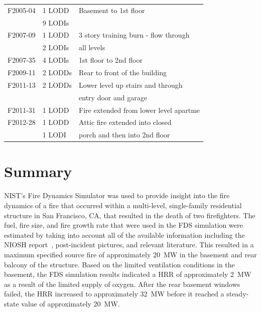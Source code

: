 \documentclass[12pt,oneside]{book}
\begin{document}
\begin{table}[!ht]
\begin{tabular}{lll}
F2005-04 \cite{NIOSH:McFall4}       &  1 LODD             &  Basement to 1st floor                   \\
                                    &  9 LODIs            &                                          \\
F2007-09 \cite{NIOSH:Tarley}        &  1 LODD             &  3 story training burn - flow through    \\
                                    &  2 LODIs            &  all levels                              \\
F2007-35 \cite{NIOSH:Braddee}       &  4 LODIs            &  1st floor to 2nd floor                  \\
F2009-11 \cite{NIOSH:Merinar}       &  2 LODDs            &  Rear to front of the building           \\
F2011-13 \cite{NIOSH:Bowyer2}       &  2 LODDs            &  Lower level up stairs and through       \\
                                    &                     &  entry door and garage                   \\
F2011-31 \cite{NIOSH:Loflin}        &  1 LODD             &  Fire extended from lower level apartme  \\
F2012-28 \cite{NIOSH:Bowyer}        &  1 LODD             &  Attic fire extended into closed         \\
                                    &  1 LODI             &  porch and then into 2nd floor           \\
\bottomrule
\end{tabular}
\label{tab:LODD}
\end{table}


\chapter{Summary}
\label{sec:summary}

NIST's Fire Dynamics Simulator was used to provide insight into the fire dynamics of a fire that occurred within a multi-level, single-family residential structure in San Francisco, CA, that resulted in the death of two firefighters. The fuel, fire size, and fire growth rate that were used in the FDS simulation were estimated by taking into account all of the available information including the NIOSH report~\cite{NIOSH:Bowyer2}, post-incident pictures, and relevant literature. This resulted in a maximum specified source fire of approximately 20~MW in the basement and rear balcony of the structure. Based on the limited ventilation conditions in the basement, the FDS simulation results indicated a HRR of approximately 2~MW as a result of the limited supply of oxygen. After the rear basement windows failed, the HRR increased to approximately 32~MW before it reached a steady-state value of approximately 20~MW.
\end{document}
